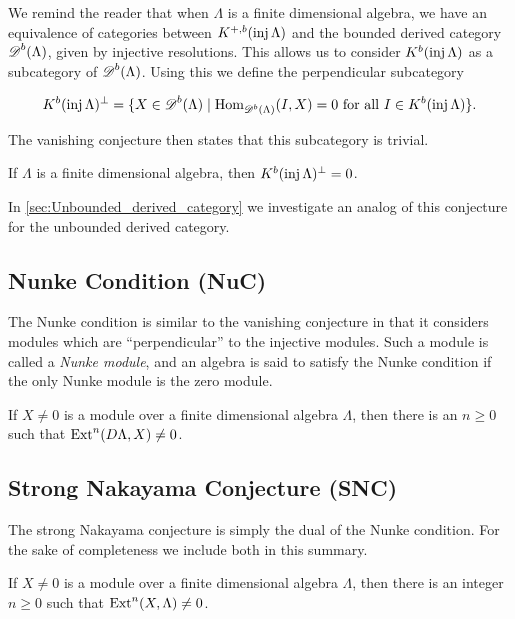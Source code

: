 We remind the reader that when $\Lambda$ is a finite dimensional algebra, we have an equivalence of categories between $K^{+,b}(\operatorname{inj}\Lambda)$ and the bounded derived category $\operatorname{\mathscr{D}}^b(\Lambda)$, given by injective resolutions. This allows us to consider $K^b(\operatorname{inj}\Lambda)$ as a subcategory of $\operatorname{\mathscr{D}}^b(\Lambda)$. Using this we define the perpendicular subcategory

\begin{align*}
	K^b(\operatorname{inj}\Lambda)^\perp = \{X \in \operatorname{\mathscr{D}}^b(\Lambda) \mid \operatorname{Hom}_{\operatorname{\mathscr{D}}^b(\Lambda)}(I, X)=0 \text{ for all } I \in K^b(\operatorname{inj}\Lambda)\}.
\end{align*}

The vanishing conjecture then states that this subcategory is trivial.
\begin{conj} 
	If $\Lambda$ is a finite dimensional algebra, then $K^b(\operatorname{inj}\Lambda)^\perp = 0$.
\end{conj}

In \cref{sec:Unbounded_derived_category} we investigate an analog of this conjecture for the unbounded derived category.

\subsection*{Nunke Condition (NuC)}
The Nunke condition is similar to the vanishing conjecture in that it considers modules which are ``perpendicular'' to the injective modules. Such a module is called a \emph{Nunke module}, and an algebra is said to satisfy the Nunke condition if the only Nunke module is the zero module.

\begin{conj} 
	If $X \neq 0$ is a module over a finite dimensional algebra $\Lambda$, then there is an $n \geq 0$ such that $\operatorname{Ext}^n(D\Lambda, X) \neq 0$. 
\end{conj}

\subsection*{Strong Nakayama Conjecture (SNC)}
The strong Nakayama conjecture is simply the dual of the Nunke condition. For the sake of completeness we include both in this summary.

\begin{conj} 
	If $X \neq 0$ is a module over a finite dimensional algebra $\Lambda$, then there is an integer $n \geq 0$ such that $\operatorname{Ext}^n(X,\Lambda) \neq 0$. 
\end{conj}

